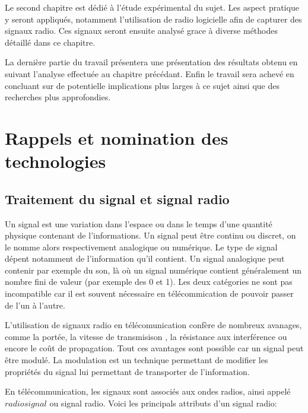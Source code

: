\documentclass[12pt,a4paper,oneside, titlepage]{report}
\begin{document}
Le second chapitre est dédié à l'étude expérimental du sujet. Les aspect pratique y seront appliqués, notamment l'utilisation de radio logicielle afin de capturer des signaux radio. Ces signaux seront ensuite analysé grace à diverse méthodes détaillé dans ce chapitre.

La dernière partie du travail présentera une présentation des résultats obtenu en suivant l'analyse effectuée au chapitre précédant. Enfin le travail sera achevé en concluant sur de potentielle implications plus larges à ce sujet ainsi que des recherches plus approfondies.

\chapter{Rappels et nomination des technologies}

\section{Traitement du signal et signal radio}

Un signal est une variation dans l'espace ou dans le temps d'une quantité physique contenant de l'informations. Un signal peut être continu ou discret, on le nomme alors respectivement analogique ou numérique. Le type de signal dépent notamment de l'information qu'il contient. Un signal analogique peut contenir par exemple du son, là où un signal numérique contient généralement un nombre fini de valeur (par exemple des 0 et 1).
Les deux catégories ne sont pas incompatible car il est souvent nécessaire en télécommication de pouvoir passer de l'un à l'autre.

L'utilisation de signaux radio en télécomunication confère de nombreux avanages, comme la portée, la vitesse de transmisison , la résistance aux interférence ou encore le coût de propagation. Tout ces avantages sont possible car un signal peut être modulé. La modulation est un technique permettant de modifier les propriétés du signal lui permettant de transporter de l'information.

En télécommunication, les signaux sont associés aux ondes radios, ainsi appelé $radio signal$ ou signal radio. Voici les principals attributs d'un signal radio: 
\end{document}
